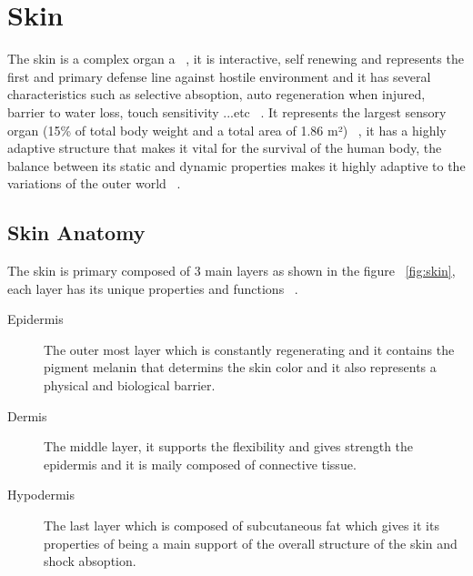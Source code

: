 \section{Skin}
The skin is a complex organ a ~\cite{elin2018}, it is interactive, self renewing and represents the first and primary defense line against hostile environment and it has several characteristics such as selective absoption, auto regeneration when injured, barrier to water loss, touch sensitivity ...etc ~\cite{joseph2020}. It represents the largest sensory organ (15\% of total body weight and a total area of 1.86 m²) ~\cite{sarah2021}, it has a highly adaptive structure that makes it vital for the survival of the human body, the balance between its static and dynamic properties makes it highly adaptive to the variations of the outer world ~\cite{eliana2022}.

\subsection{Skin Anatomy}
The skin is primary composed of 3 main layers as shown in the figure ~\ref{fig:skin}, each layer has its unique properties and functions ~\cite{sarah2021}.
\begin{description}
\item[Epidermis] The outer most layer which is constantly regenerating and it contains the pigment melanin that determins the skin color and it also represents a physical and biological barrier.
\item[Dermis] The middle layer, it supports the flexibility and gives strength the epidermis and it is maily composed of connective tissue.
\item[Hypodermis] The last layer which is composed of subcutaneous fat which gives it its properties of being a main support of the overall structure of the skin and shock absoption.
\end{description}

